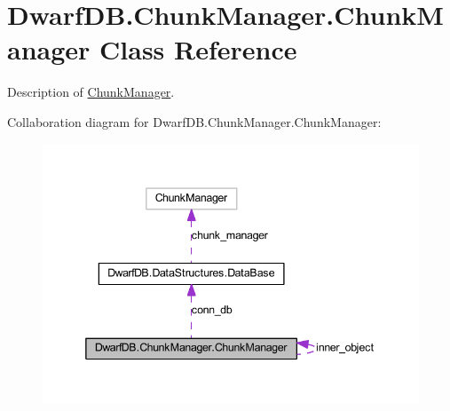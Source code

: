 \hypertarget{class_dwarf_d_b_1_1_chunk_manager_1_1_chunk_manager}{\section{Dwarf\+D\+B.\+Chunk\+Manager.\+Chunk\+Manager Class Reference}
\label{class_dwarf_d_b_1_1_chunk_manager_1_1_chunk_manager}
}


Description of \hyperlink{class_dwarf_d_b_1_1_chunk_manager_1_1_chunk_manager}{Chunk\+Manager}.  




Collaboration diagram for Dwarf\+D\+B.\+Chunk\+Manager.\+Chunk\+Manager\+:
\nopagebreak
\begin{figure}[H]
\begin{center}
\leavevmode
\includegraphics[width=341pt]{class_dwarf_d_b_1_1_chunk_manager_1_1_chunk_manager__coll__graph}
\end{center}
\end{figure}

